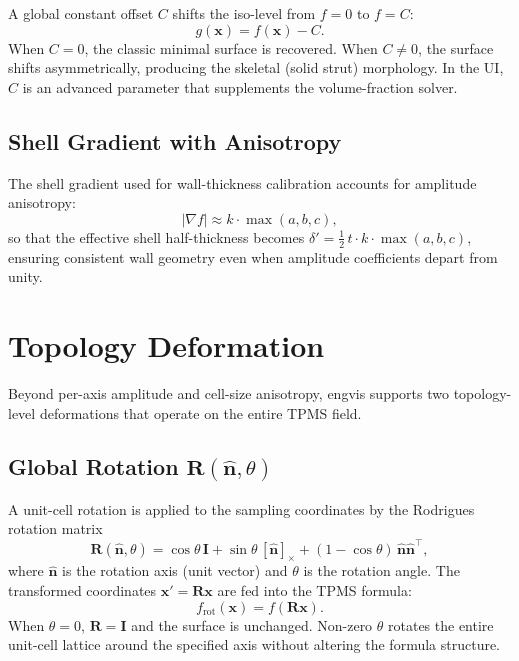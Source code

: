\documentclass[11pt]{article}
\begin{document}
A global constant offset $C$ shifts the iso-level from $f = 0$ to
$f = C$:
\begin{equation}\label{eq:offset}
  g(\mathbf{x}) = f(\mathbf{x}) - C.
\end{equation}
When $C = 0$, the classic minimal surface is recovered.  When $C \neq 0$,
the surface shifts asymmetrically, producing the skeletal (solid strut)
morphology.  In the UI, $C$ is an advanced parameter that supplements
the volume-fraction solver.

\subsection{Shell Gradient with Anisotropy}

The shell gradient used for wall-thickness calibration accounts for
amplitude anisotropy:
\begin{equation}\label{eq:aniso-shell-grad}
  |\nabla f| \approx k \cdot \max(a, b, c),
\end{equation}
so that the effective shell half-thickness becomes
$\delta' = \tfrac{1}{2}\,t \cdot k \cdot \max(a,b,c)$, ensuring
consistent wall geometry even when amplitude coefficients depart from
unity.

\section{Topology Deformation}\label{sec:topology-deformation}

Beyond per-axis amplitude and cell-size anisotropy, engvis supports
two topology-level deformations that operate on the entire TPMS field.

\subsection{Global Rotation $\mathbf{R}(\hat{\mathbf{n}}, \theta)$}

A unit-cell rotation is applied to the sampling coordinates by the
Rodrigues rotation matrix
\begin{equation}\label{eq:rodrigues}
  \mathbf{R}(\hat{\mathbf{n}}, \theta)
    = \cos\theta\, \mathbf{I}
    + \sin\theta\, [\hat{\mathbf{n}}]_\times
    + (1 - \cos\theta)\, \hat{\mathbf{n}}\hat{\mathbf{n}}^\top,
\end{equation}
where $\hat{\mathbf{n}}$ is the rotation axis (unit vector) and
$\theta$ is the rotation angle.  The transformed coordinates
$\mathbf{x}' = \mathbf{R}\mathbf{x}$ are fed into the TPMS formula:
\begin{equation}\label{eq:rotated-tpms}
  f_{\text{rot}}(\mathbf{x}) = f(\mathbf{R}\mathbf{x}).
\end{equation}
When $\theta = 0$, $\mathbf{R} = \mathbf{I}$ and the surface is
unchanged.  Non-zero $\theta$ rotates the entire unit-cell lattice
around the specified axis without altering the formula structure.
\end{document}
